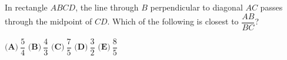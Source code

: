 In rectangle $ABCD$, the line through $B$ perpendicular to diagonal $AC$ passes through the midpoint of $CD$. Which of the following is closest to $\dfrac{AB}{BC}$?

$\textbf{(A)}\ $$\dfrac54$ \qquad $\textbf{(B)}\ $$\dfrac43$ \qquad $\textbf{(C)}\ $$\dfrac75$ \qquad $\textbf{(D)}\ $$\dfrac32$ \qquad $\textbf{(E)}\ $$\dfrac85$
